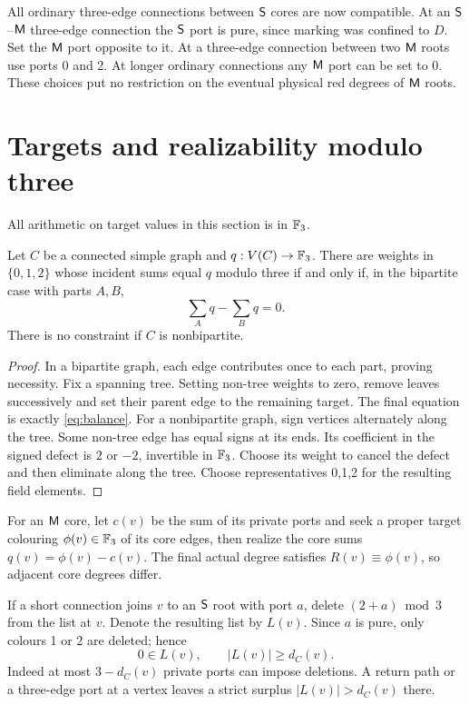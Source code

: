 All ordinary three-edge connections between $\mathsf S$ cores are now
compatible.  At an $\mathsf S$--$\mathsf M$ three-edge connection the $\mathsf S$ port
is pure, since marking was confined to $D$.  Set the $\mathsf M$ port
opposite to it.  At a three-edge connection between two $\mathsf M$ roots
use ports 0 and 2.  At longer ordinary connections any $\mathsf M$ port
can be set to 0.  These choices put no restriction on the eventual
physical red degrees of $\mathsf M$ roots.

\section{Targets and realizability modulo three}\label{sec:mod}

All arithmetic on target values in this section is in $\mathbb F_3$.

\begin{lemma}\label{lem:linear}
Let $C$ be a connected simple graph and $q:V(C)\to\mathbb F_3$.
There are weights in $\{0,1,2\}$ whose incident sums equal $q$ modulo
three if and only if, in the bipartite case with parts $A,B$,
\begin{equation}\label{eq:balance}
 \sum_Aq-\sum_Bq=0.
\end{equation}
There is no constraint if $C$ is nonbipartite.
\end{lemma}
\begin{proof}
In a bipartite graph, each edge contributes once to each part, proving
necessity.  Fix a spanning tree.  Setting non-tree weights to zero,
remove leaves successively and set their parent edge to the remaining
target.  The final equation is exactly \eqref{eq:balance}.
For a nonbipartite graph, sign vertices alternately along the tree.
Some non-tree edge has equal signs at its ends.  Its coefficient in
the signed defect is $2$ or $-2$, invertible in $\mathbb F_3$.  Choose its
weight to cancel the defect and then eliminate along the tree.
Choose representatives 0,1,2 for the resulting field elements.
\end{proof}

For an $\mathsf M$ core, let $c(v)$ be the sum of its private ports and seek
a proper target colouring $\phi(v)\in\mathbb F_3$ of its core edges, then
realize the core sums $q(v)=\phi(v)-c(v)$.  The final actual degree
satisfies $R(v)\equiv\phi(v)$, so adjacent core degrees differ.

If a short connection joins $v$ to an $\mathsf S$ root with port $a$, delete
$(2+a)\bmod3$ from the list at $v$.  Denote the resulting list by
$L(v)$.  Since $a$ is pure, only colours 1 or 2 are deleted; hence
\begin{equation}\label{eq:lists}
 0\in L(v),\qquad |L(v)|\ge d_C(v).
\end{equation}
Indeed at most $3-d_C(v)$ private ports can impose deletions.
A return path or a three-edge port at a vertex leaves a strict
surplus $|L(v)|>d_C(v)$ there.

